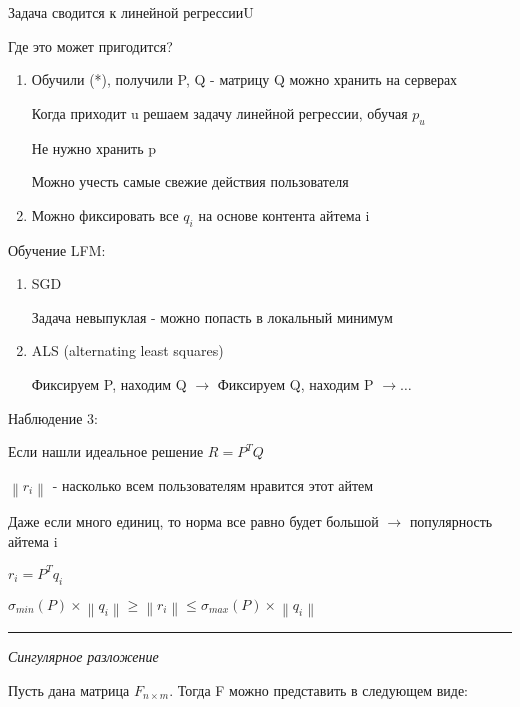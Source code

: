 \documentclass[a4paper, 12pt]{article}
\newcommand\norm[1]{\left\lVert#1\right\rVert}
\begin{document}
\begin{enumerate}
\begin{enumerate}
        Задача сводится к линейной регрессииU

        Где это может пригодится?
        \begin{enumerate}
            \item Обучили (*), получили P, Q
            - матрицу Q можно хранить на серверах

            Когда приходит u решаем задачу линейной регрессии,
            обучая $p_u$

            Не нужно хранить p

            Можно учесть самые свежие действия пользователя
            \item Можно фиксировать все $q_i$ на основе контента
            айтема i
        \end{enumerate}

        Обучение LFM:

        \begin{enumerate}
            \item SGD
            
            Задача невыпуклая - можно попасть в локальный минимум

            \item ALS (alternating least squares)
            
            Фиксируем P, находим Q 
            $\rightarrow$ Фиксируем Q, находим P
            $\rightarrow \ldots$
        \end{enumerate}

        Наблюдение 3:

        Если нашли идеальное решение $R = P^TQ$

        $\norm{r_i}$ - насколько всем пользователям
        нравится этот айтем

        Даже если много единиц, то норма все равно будет
        большой $\rightarrow$ популярность айтема i

        $r_i = P^Tq_i$

        $\sigma_{min}(P) \times \norm{q_i} \geq \norm{r_i} 
        \leq \sigma_{max}(P) \times \norm{q_i}$

        \rule{\linewidth}{0.5pt}

        \begin{center}
            \textit{Сингулярное разложение}
        \end{center}

        Пусть дана матрица $F_{n \times m}$. Тогда F
        можно представить в следующем виде:


\end{enumerate}
\end{enumerate}
\end{document}
